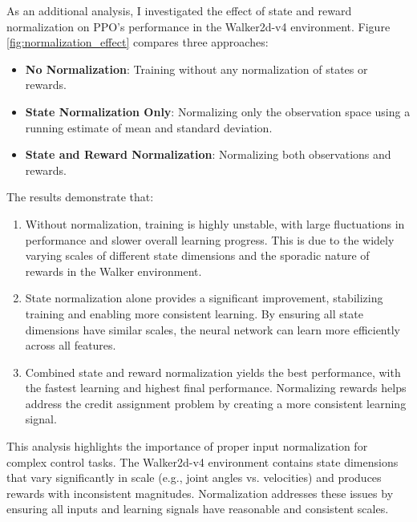 \documentclass[a4paper,twocolumn]{article}
\begin{document}

As an additional analysis, I investigated the effect of state and reward normalization on PPO's performance in the Walker2d-v4 environment. Figure \ref{fig:normalization_effect} compares three approaches:

\begin{itemize}
    \item \textbf{No Normalization}: Training without any normalization of states or rewards.
    
    \item \textbf{State Normalization Only}: Normalizing only the observation space using a running estimate of mean and standard deviation.
    
    \item \textbf{State and Reward Normalization}: Normalizing both observations and rewards.
\end{itemize}

The results demonstrate that:

\begin{enumerate}
    \item Without normalization, training is highly unstable, with large fluctuations in performance and slower overall learning progress. This is due to the widely varying scales of different state dimensions and the sporadic nature of rewards in the Walker environment.
    
    \item State normalization alone provides a significant improvement, stabilizing training and enabling more consistent learning. By ensuring all state dimensions have similar scales, the neural network can learn more efficiently across all features.
    
    \item Combined state and reward normalization yields the best performance, with the fastest learning and highest final performance. Normalizing rewards helps address the credit assignment problem by creating a more consistent learning signal.
\end{enumerate}

This analysis highlights the importance of proper input normalization for complex control tasks. The Walker2d-v4 environment contains state dimensions that vary significantly in scale (e.g., joint angles vs. velocities) and produces rewards with inconsistent magnitudes. Normalization addresses these issues by ensuring all inputs and learning signals have reasonable and consistent scales.
\end{document}
